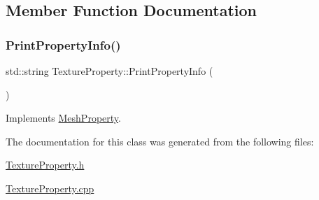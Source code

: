 \subsection{Member Function Documentation}
\mbox{\label{class_texture_property_a701b7bb567726578a322b078d35b8711}} 
\subsubsection{\texorpdfstring{PrintPropertyInfo()}{PrintPropertyInfo()}}
{\footnotesize\ttfamily std\+::string Texture\+Property\+::\+Print\+Property\+Info (\begin{DoxyParamCaption}{ }\end{DoxyParamCaption})\hspace{0.3cm}{\ttfamily [virtual]}}



Implements \mbox{\hyperlink{class_mesh_property_aecb4479e9430b8071104fbf7dde0b1c5}{Mesh\+Property}}.



The documentation for this class was generated from the following files\+:\begin{DoxyCompactItemize}
\item 
\mbox{\hyperlink{_texture_property_8h}{Texture\+Property.\+h}}\item 
\mbox{\hyperlink{_texture_property_8cpp}{Texture\+Property.\+cpp}}\end{DoxyCompactItemize}
